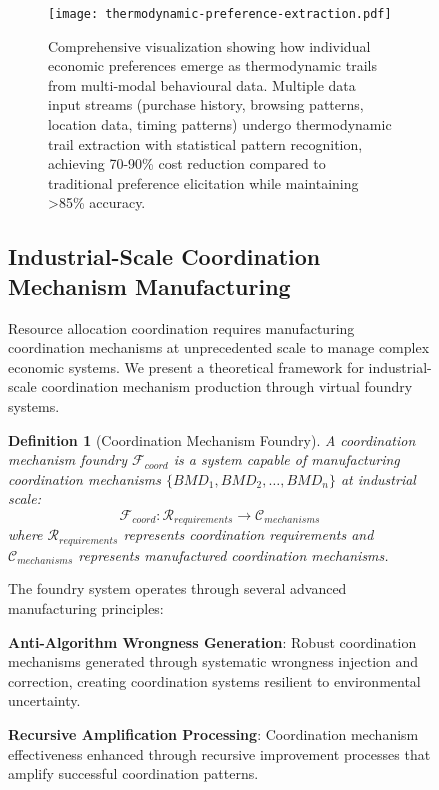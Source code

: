 \documentclass[12pt,a4paper]{article}
\newtheorem{definition}[theorem]{Definition}
\begin{document}
\begin{figure}[H]
\begin{figure}[H]
\centering
\texttt{[image: thermodynamic-preference-extraction.pdf]}
\caption{Comprehensive visualization showing how individual economic preferences emerge as thermodynamic trails from multi-modal behavioural data. Multiple data input streams (purchase history, browsing patterns, location data, timing patterns) undergo thermodynamic trail extraction with statistical pattern recognition, achieving 70-90\% cost reduction compared to traditional preference elicitation while maintaining >85\% accuracy.}
\label{fig:thermodynamic_preference-extraction}
\end{figure}

\subsection{Industrial-Scale Coordination Mechanism Manufacturing}

Resource allocation coordination requires manufacturing coordination mechanisms at unprecedented scale to manage complex economic systems. We present a theoretical framework for industrial-scale coordination mechanism production through virtual foundry systems.

\begin{definition}[Coordination Mechanism Foundry]
A coordination mechanism foundry $\mathcal{F}_{coord}$ is a system capable of manufacturing coordination mechanisms $\{BMD_1, BMD_2, \ldots, BMD_n\}$ at industrial scale:
\begin{equation}
\mathcal{F}_{coord}: \mathcal{R}_{requirements} \rightarrow \mathcal{C}_{mechanisms}
\end{equation}
where $\mathcal{R}_{requirements}$ represents coordination requirements and $\mathcal{C}_{mechanisms}$ represents manufactured coordination mechanisms.
\end{definition}

The foundry system operates through several advanced manufacturing principles:

\textbf{Anti-Algorithm Wrongness Generation}: Robust coordination mechanisms generated through systematic wrongness injection and correction, creating coordination systems resilient to environmental uncertainty.

\textbf{Recursive Amplification Processing}: Coordination mechanism effectiveness enhanced through recursive improvement processes that amplify successful coordination patterns.


\end{figure}
\end{document}

